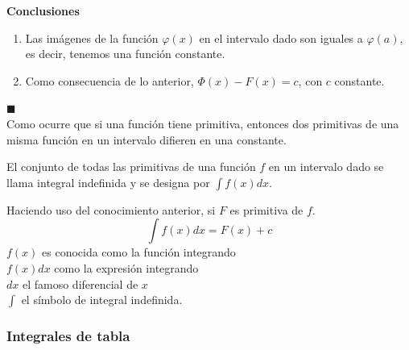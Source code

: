 \documentclass[10pt,twoside]{SelfArx} %
\begin{document}
\textbf{   Conclusiones} 
\begin{enumerate}
\item    Las imágenes de la función $ \varphi(x) $ en el intervalo dado son iguales a $ \varphi(a) $, es decir, tenemos una función constante.
\item 	Como consecuencia de lo anterior, $ \varPhi(x)-F(x)=   c $, con $ c $ constante.
   
   
   
   
   
\end{enumerate}   
$ \blacksquare $\\

Como ocurre que si una función tiene primitiva, entonces dos primitivas de una misma función en un intervalo difieren en una constante.

\begin{thm}
	El conjunto de todas las primitivas de una función $ f $ en un intervalo dado se llama integral indefinida y se designa por $ \displaystyle\int f(x)dx $.
\end{thm}
   Haciendo uso del conocimiento anterior, si $ F $ es primitiva de $ f $.
   \[ \int f(x)dx=F(x)+c \]
   $ f(x) $ es conocida como la función integrando\\
   $ f(x)dx $ como la expresión integrando\\
   $ dx $ el famoso diferencial de $ x $\\
   $ \int $ el símbolo de integral indefinida.\\
   
   
   
   \subsubsection{Integrales de tabla}
   
\end{document}
